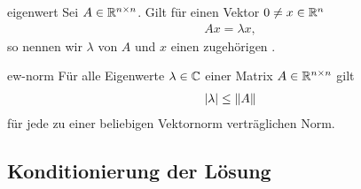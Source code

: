 \begin{Definition}{eigenwert}
  Sei $A\in \mathbb R^{n\times n}$. Gilt für einen Vektor $0\neq x\in \mathbb R^n$
  \begin{gather}
    Ax = \lambda x,
  \end{gather}
  so nennen wir $\lambda$  von $A$ und $x$ einen
  zugehörigen .
\end{Definition}

\begin{Lemma}{ew-norm}
  Für alle Eigenwerte $\lambda\in\mathbb C$ einer Matrix $A\in\mathbb R^{n\times n}$ gilt
  \begin{gather}
    \lvert\lambda\rvert \le \lVert A\rVert
  \end{gather}
  für jede zu einer beliebigen Vektornorm verträglichen Norm.
\end{Lemma}

\subsection{Konditionierung der Lösung}


